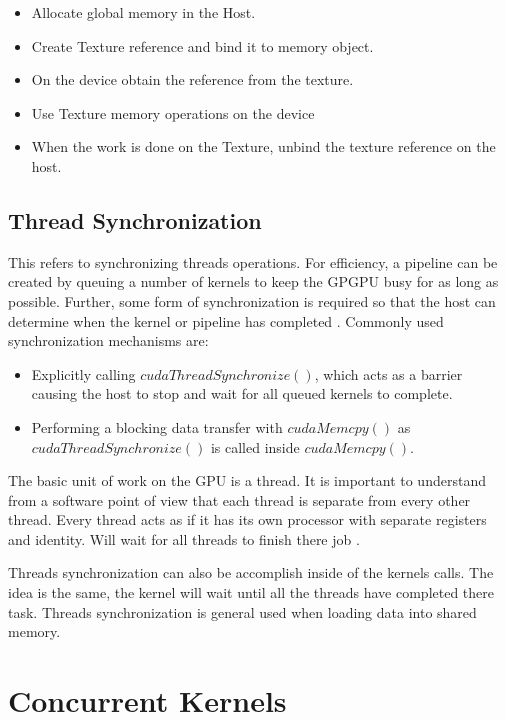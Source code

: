\begin{itemize}
\item Allocate global memory in the Host.
\item Create Texture reference and bind it to memory object.
\item On the device obtain the reference from the texture.
\item  Use Texture memory operations on the device
\item  When the work is done on the Texture, unbind the texture reference on the host.
\end{itemize}

\subsection{Thread Synchronization}

This refers to synchronizing threads operations. For efficiency, a pipeline can be created by queuing a number of kernels to keep the GPGPU busy for as long as possible. Further, some form of synchronization is required so that the host can determine when the kernel or pipeline has completed \cite{design}. Commonly used synchronization mechanisms are:

\begin{itemize}
  \item Explicitly calling $cudaThreadSynchronize()$, which acts as a barrier causing the host to stop and wait for all queued kernels to complete.
  \item Performing a blocking data transfer with $cudaMemcpy()$ as $cudaThreadSynchronize()$ is called inside $cudaMemcpy()$.
\end{itemize}

The basic unit of work on the GPU is a thread. It is important to understand from a software point of view that each thread is separate from every other thread. Every thread acts as if it has its own processor with separate registers and identity. Will wait for all threads to finish there job \cite{design}.

Threads synchronization can also be accomplish inside of the kernels calls. The idea is the same, the kernel will wait until all the threads have completed there task. Threads synchronization is general used when loading data into shared memory. 

\section{Concurrent Kernels}


